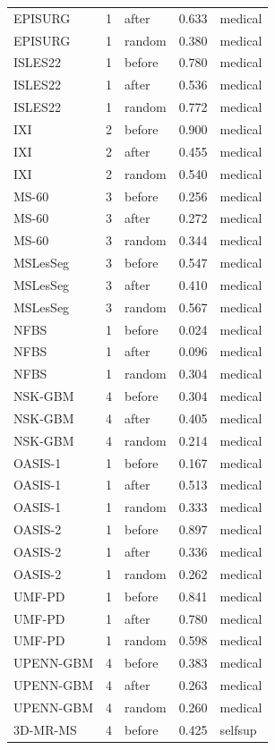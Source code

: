 \begin{tabular}{lrlrl}
EPISURG & 1 & after & 0.633 & medical \\
EPISURG & 1 & random & 0.380 & medical \\
ISLES22 & 1 & before & 0.780 & medical \\
ISLES22 & 1 & after & 0.536 & medical \\
ISLES22 & 1 & random & 0.772 & medical \\
IXI & 2 & before & 0.900 & medical \\
IXI & 2 & after & 0.455 & medical \\
IXI & 2 & random & 0.540 & medical \\
MS-60 & 3 & before & 0.256 & medical \\
MS-60 & 3 & after & 0.272 & medical \\
MS-60 & 3 & random & 0.344 & medical \\
MSLesSeg & 3 & before & 0.547 & medical \\
MSLesSeg & 3 & after & 0.410 & medical \\
MSLesSeg & 3 & random & 0.567 & medical \\
NFBS & 1 & before & 0.024 & medical \\
NFBS & 1 & after & 0.096 & medical \\
NFBS & 1 & random & 0.304 & medical \\
NSK-GBM & 4 & before & 0.304 & medical \\
NSK-GBM & 4 & after & 0.405 & medical \\
NSK-GBM & 4 & random & 0.214 & medical \\
OASIS-1 & 1 & before & 0.167 & medical \\
OASIS-1 & 1 & after & 0.513 & medical \\
OASIS-1 & 1 & random & 0.333 & medical \\
OASIS-2 & 1 & before & 0.897 & medical \\
OASIS-2 & 1 & after & 0.336 & medical \\
OASIS-2 & 1 & random & 0.262 & medical \\
UMF-PD & 1 & before & 0.841 & medical \\
UMF-PD & 1 & after & 0.780 & medical \\
UMF-PD & 1 & random & 0.598 & medical \\
UPENN-GBM & 4 & before & 0.383 & medical \\
UPENN-GBM & 4 & after & 0.263 & medical \\
UPENN-GBM & 4 & random & 0.260 & medical \\
3D-MR-MS & 4 & before & 0.425 & selfsup \\

\end{tabular}
